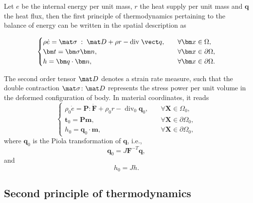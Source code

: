 Let \(e\) be the internal energy per unit mass, \(r\) the heat supply per unit mass and \(\bm q\) the heat flux, then the first principle of thermodynamics pertaining to the balance of energy can be written in the spatial description as
\begin{highlight}
\begin{equation} \label{eq:first_principle_thermo}
  \begin{cases}
    \rho\dot e = \mat \sigma\;:\;\mat D + \rho r -\text{div}\;\vect q,\quad &\forall \bm x\in\Omega,\\
    \bm t = \bm \sigma \bm n,\quad &\forall \bm x\in \partial \Omega,\\
    h = \bm q \cdot \bm n,\quad &\forall \bm x\in \partial \Omega.
  \end{cases}
\end{equation}
\end{highlight}
The second order tensor $\mat D$ denotes a strain rate measure, such that the double contraction $\mat \sigma\colon\mat D$ represents the stress power per unit volume in the deformed configuration of body.
In material coordinates, it reads
\begin{equation}
  \begin{cases}
 \rho_0 \dot e = \bm P :\dot{\bm F} + \rho_0 r -\operatorname{div}_0 \bm q_0,\quad& \forall \bm X\in\Omega_0,\\
 \bm t_0 = \bm P\bm m,\quad&\forall \bm X\in\partial \Omega_0,\\
 h_0 = \bm q_0\cdot\bm m,\quad&\forall \bm X\in\partial \Omega_0,
  \end{cases}
\end{equation}
where \(\bm q_0\) is the Piola transformation of \(\bm q\), i.e.,
\begin{equation}
  \bm q_0 = J \bm F^{-T} \bm q,
\end{equation}
and
\begin{equation}
  h_0 = J h.
\end{equation}


\subsection{Second principle of thermodynamics}

